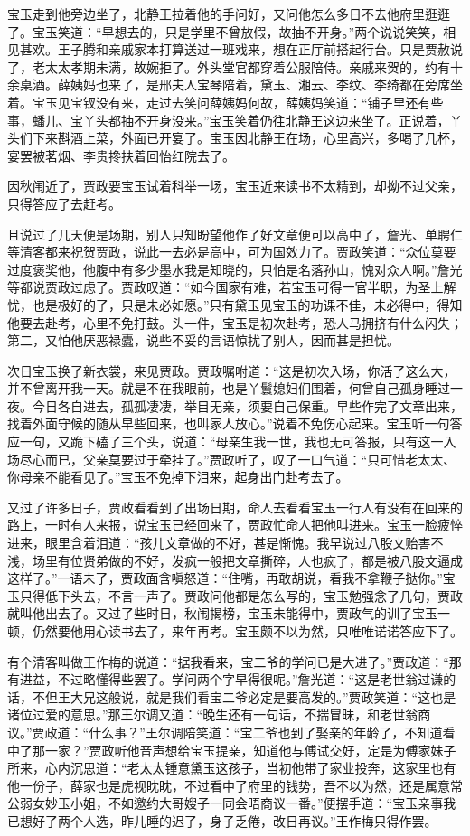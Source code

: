 \documentclass[12pt,oneside]{book}
\begin{document}
宝玉走到他旁边坐了，北静王拉着他的手问好，又问他怎么多日不去他府里逛逛了。宝玉笑道：“早想去的，只是学里不曾放假，故抽不开身。”两个说说笑笑，相见甚欢。王子腾和亲戚家本打算送过一班戏来，想在正厅前搭起行台。只是贾赦说了，老太太孝期未满，故婉拒了。外头堂官都穿着公服陪侍。亲戚来贺的，约有十余桌酒。薛姨妈也来了，是邢夫人宝琴陪着，黛玉、湘云、李纹、李绮都在旁席坐着。宝玉见宝钗没有来，走过去笑问薛姨妈何故，薛姨妈笑道：“铺子里还有些事，蟠儿、宝丫头都抽不开身没来。”宝玉笑着仍往北静王这边来坐了。正说着，丫头们下来斟酒上菜，外面已开宴了。宝玉因北静王在场，心里高兴，多喝了几杯，宴罢被茗烟、李贵搀扶着回怡红院去了。

因秋闱近了，贾政要宝玉试着科举一场，宝玉近来读书不太精到，却拗不过父亲，只得答应了去赶考。

且说过了几天便是场期，别人只知盼望他作了好文章便可以高中了，詹光、单聘仁等清客都来祝贺贾政，说此一去必是高中，可为国效力了。贾政笑道：“众位莫要过度褒奖他，他腹中有多少墨水我是知晓的，只怕是名落孙山，愧对众人啊。”詹光等都说贾政过虑了。贾政叹道：“如今国家有难，若宝玉可得一官半职，为圣上解忧，也是极好的了，只是未必如愿。”只有黛玉见宝玉的功课不佳，未必得中，得知他要去赴考，心里不免打鼓。头一件，宝玉是初次赴考，恐人马拥挤有什么闪失；第二，又怕他厌恶禄蠹，说些不妥的言语惊扰了别人，因而甚是担忧。

次日宝玉换了新衣裳，来见贾政。贾政嘱咐道：“这是初次入场，你活了这么大，并不曾离开我一天。就是不在我眼前，也是丫鬟媳妇们围着，何曾自己孤身睡过一夜。今日各自进去，孤孤凄凄，举目无亲，须要自己保重。早些作完了文章出来，找着外面守候的随从早些回来，也叫家人放心。”说着不免伤心起来。宝玉听一句答应一句，又跪下磕了三个头，说道：“母亲生我一世，我也无可答报，只有这一入场尽心而已，父亲莫要过于牵挂了。”贾政听了，叹了一口气道：“只可惜老太太、你母亲不能看见了。”宝玉不免掉下泪来，起身出门赴考去了。

又过了许多日子，贾政看看到了出场日期，命人去看看宝玉一行人有没有在回来的路上，一时有人来报，说宝玉已经回来了，贾政忙命人把他叫进来。宝玉一脸疲悴进来，眼里含着泪道：“孩儿文章做的不好，甚是惭愧。我早说过八股文贻害不浅，场里有位贤弟做的不好，发疯一般把文章撕碎，人也疯了，都是被八股文逼成这样了。”一语未了，贾政面含嗔怒道：“住嘴，再敢胡说，看我不拿鞭子挞你。”宝玉只得低下头去，不言一声了。贾政问他都是怎么写的，宝玉勉强念了几句，贾政就叫他出去了。又过了些时日，秋闱揭榜，宝玉未能得中，贾政气的训了宝玉一顿，仍然要他用心读书去了，来年再考。宝玉颇不以为然，只唯唯诺诺答应下了。

有个清客叫做王作梅的说道：“据我看来，宝二爷的学问已是大进了。”贾政道：“那有进益，不过略懂得些罢了。学问两个字早得很呢。”詹光道：“这是老世翁过谦的话，不但王大兄这般说，就是我们看宝二爷必定是要高发的。”贾政笑道：“这也是诸位过爱的意思。”那王尔调又道：“晚生还有一句话，不揣冒昧，和老世翁商议。”贾政道：“什么事？”王尔调陪笑道：“宝二爷也到了娶亲的年龄了，不知道看中了那一家？”贾政听他音声想给宝玉提亲，知道他与傅试交好，定是为傅家妹子所来，心内沉思道：“老太太锺意黛玉这孩子，当初他带了家业投奔，这家里也有他一份子，薛家也是虎视眈眈，不过看中了府里的钱势，吾不以为然，还是属意常公弱女妙玉小姐，不如邀约大哥嫂子一同会晤商议一番。”便摆手道：“宝玉亲事我已想好了两个人选，昨儿睡的迟了，身子乏倦，改日再议。”王作梅只得作罢。
\end{document}
